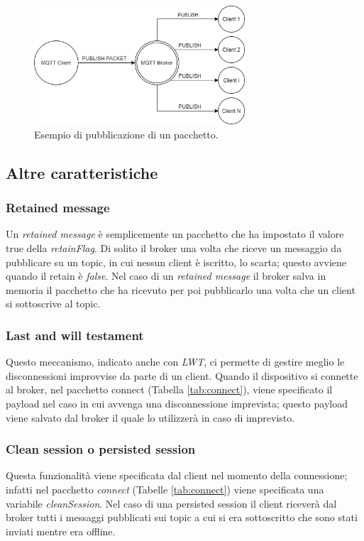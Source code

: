\documentclass[Lau,binding=0.6cm,noexaminfo=true]{sapthesis}
\begin{document}
\begin{large}
\begin{figure}[h]
\centering
\includegraphics[width=0.7\textwidth]{images/publish-flow-example.png}
\caption{Esempio di pubblicazione di un pacchetto.}
\label{fig:publish-flow-example}
\end{figure}

\subsection{Altre caratteristiche}
\subsubsection{Retained message}
Un \textit{retained message} è semplicemente un pacchetto che ha impostato il valore true della \textit{retainFlag}. Di solito il broker una volta che riceve un messaggio da pubblicare su un topic, in cui nessun client è iscritto, lo scarta; questo avviene quando il retain è \textit{false}. Nel caso di un \textit{retained message} il broker salva in memoria il pacchetto che ha ricevuto per poi pubblicarlo una volta che un client si sottoscrive al topic.

\subsubsection{Last and will testament}
Questo meccanismo, indicato anche con \textit{LWT}, ci permette di gestire meglio le disconnessioni improvvise da parte di un client. Quando il dispositivo si connette al broker, nel pacchetto connect (Tabella \ref{tab:connect}), viene specificato il payload nel caso in cui avvenga una disconnessione imprevista; questo payload viene salvato dal broker il quale lo utilizzerà in caso di imprevisto.

\subsubsection{Clean session o persisted session}
Questa funzionalità viene specificata dal client nel momento della connessione; infatti nel pacchetto \textit{connect} (Tabelle \ref{tab:connect}) viene specificata una variabile \textit{cleanSession}. Nel caso di una persisted session il client riceverà dal broker tutti i messaggi pubblicati sui topic a cui si era sottoscritto che sono stati inviati mentre era offline.
\end{large}
\end{document}
